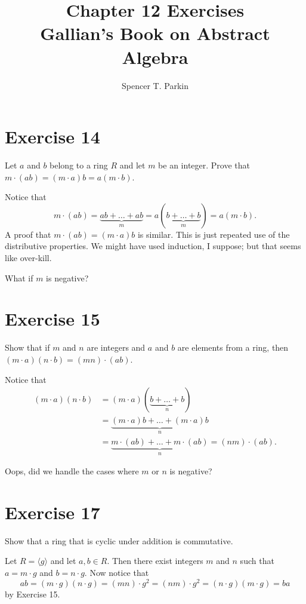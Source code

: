 \documentclass[12pt]{article}
\title{Chapter 12 Exercises\\Gallian's Book on Abstract Algebra}
\author{Spencer T. Parkin}
\begin{document}
\maketitle

\section*{Exercise 14}

Let $a$ and $b$ belong to a ring $R$ and let $m$ be an integer.  Prove
that $m\cdot (ab)=(m\cdot a)b=a(m\cdot b)$.

Notice that
\begin{equation*}
m\cdot (ab)=\underbrace{ab+\dots+ab}_m=a(\underbrace{b+\dots+b}_m)=a(m\cdot b).
\end{equation*}
A proof that $m\cdot (ab)=(m\cdot a)b$ is similar.  This is just repeated use of the distributive
properties.  We might have used induction, I suppose; but that seems like over-kill.

What if $m$ is negative?

\section*{Exercise 15}

Show that if $m$ and $n$ are integers and $a$ and $b$ are elements from a ring,
then $(m\cdot a)(n\cdot b)=(mn)\cdot(ab)$.

Notice that
\begin{align*}
(m\cdot a)(n\cdot b) &= (m\cdot a)(\underbrace{b+\dots+b}_n) \\
 &= \underbrace{(m\cdot a)b+\dots+(m\cdot a)b}_n \\
 &= \underbrace{m\cdot (ab)+\dots+ m\cdot(ab)}_n = (nm)\cdot (ab).
\end{align*}

Oops, did we handle the cases where $m$ or $n$ is negative?

\section*{Exercise 17}

Show that a ring that is cyclic under addition is commutative.

Let $R=\langle g\rangle$ and let $a,b\in R$.
Then there exist integers $m$ and $n$ such that
$a=m\cdot g$ and $b=n\cdot g$.  Now notice that
\begin{equation*}
ab=(m\cdot g)(n\cdot g)=(mn)\cdot g^2=(nm)\cdot g^2=(n\cdot g)(m\cdot g)=ba
\end{equation*}
by Exercise 15.
\end{document}
